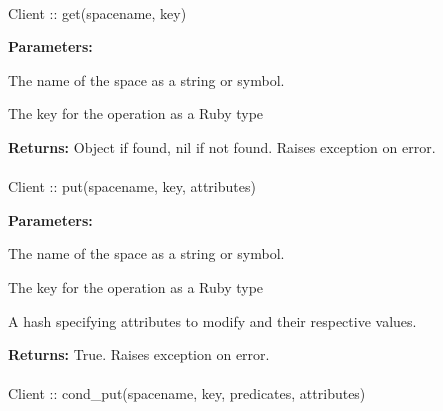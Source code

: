 
\paragraph{}
\label{api:ruby:get}
\begin{ccode}
Client :: get(spacename, key)
\end{ccode}
\funcdesc 

\noindent\textbf{Parameters:}
\begin{description}[labelindent=\widthof{{\code{spacename}}},leftmargin=*,noitemsep,nolistsep,align=right]
\item[\code{spacename}] The name of the space as a string or symbol.
\item[\code{key}] The key for the operation as a Ruby type
\end{description}

\noindent\textbf{Returns:}
Object if found, nil if not found.  Raises exception on error.

\paragraph{}
\label{api:ruby:put}
\begin{ccode}
Client :: put(spacename, key, attributes)
\end{ccode}
\funcdesc 

\noindent\textbf{Parameters:}
\begin{description}[labelindent=\widthof{{\code{attributes}}},leftmargin=*,noitemsep,nolistsep,align=right]
\item[\code{spacename}] The name of the space as a string or symbol.
\item[\code{key}] The key for the operation as a Ruby type
\item[\code{attributes}] A hash specifying attributes to modify and their respective values.
\end{description}

\noindent\textbf{Returns:}
True.  Raises exception on error.

\paragraph{}
\label{api:ruby:cond_put}
\begin{ccode}
Client :: cond_put(spacename, key, predicates, attributes)
\end{ccode}
\funcdesc 

